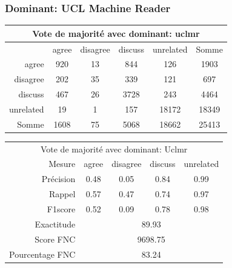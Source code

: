 \documentclass[11pt,a4paper,oldfontcommands]{memoir}
\begin{document}
\subsubsection{Dominant: UCL Machine Reader}

\begin{center}
 \begin{tabular}{ r | c c c c | c }
  \multicolumn{6}{c}{Vote de majorité avec dominant: uclmr}  \\
  \hline
            & agree & disagree & discuss & unrelated & Somme \\
  \hline
  agree     & 920   & 13       & 844     & 126       & 1903  \\
  disagree  & 202   & 35       & 339     & 121       & 697   \\
  discuss   & 467   & 26       & 3728    & 243       & 4464  \\
  unrelated & 19    & 1        & 157     & 18172     & 18349 \\
  \hline
  Somme     & 1608  & 75       & 5068    & 18662     & 25413 \\
 \end{tabular}
\end{center}


\begin{center}
 \begin{tabular}{ r | c c c c }
  \multicolumn{5}{c}{Vote de majorité avec dominant: Uclmr}                      \\
  Mesure          & agree                       & disagree & discuss & unrelated \\
  \hline
  Précision       & 0.48                        & 0.05     & 0.84    & 0.99      \\
  Rappel          & 0.57                        & 0.47     & 0.74    & 0.97      \\
  F1score         & 0.52                        & 0.09     & 0.78    & 0.98      \\
  \hline
  \hline
  Exactitude      & \multicolumn{4}{c}{89.93}                                    \\
  Score FNC       & \multicolumn{4}{c}{9698.75}                                  \\
  Pourcentage FNC & \multicolumn{4}{c}{83.24}                                    \\
 \end{tabular}
\end{center}
\end{document}
